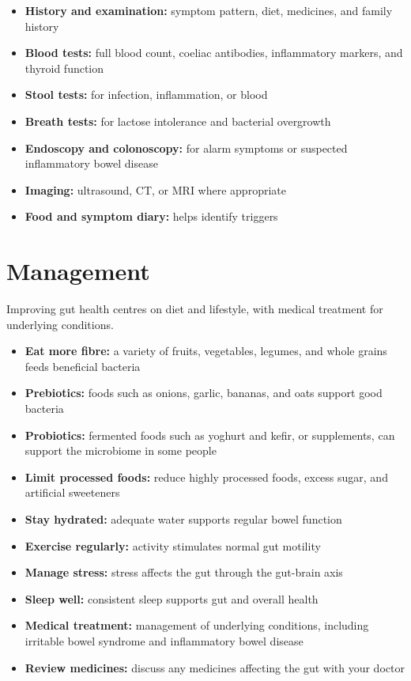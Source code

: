 \begin{itemize}
    \item \textbf{History and examination:} symptom pattern, diet, medicines, and family history
    \item \textbf{Blood tests:} full blood count, coeliac antibodies, inflammatory markers, and thyroid function
    \item \textbf{Stool tests:} for infection, inflammation, or blood
    \item \textbf{Breath tests:} for lactose intolerance and bacterial overgrowth
    \item \textbf{Endoscopy and colonoscopy:} for alarm symptoms or suspected inflammatory bowel disease
    \item \textbf{Imaging:} ultrasound, CT, or MRI where appropriate
    \item \textbf{Food and symptom diary:} helps identify triggers
\end{itemize}

\section*{Management}
Improving gut health centres on diet and lifestyle, with medical treatment for underlying conditions.

\begin{itemize}
    \item \textbf{Eat more fibre:} a variety of fruits, vegetables, legumes, and whole grains feeds beneficial bacteria
    \item \textbf{Prebiotics:} foods such as onions, garlic, bananas, and oats support good bacteria
    \item \textbf{Probiotics:} fermented foods such as yoghurt and kefir, or supplements, can support the microbiome in some people
    \item \textbf{Limit processed foods:} reduce highly processed foods, excess sugar, and artificial sweeteners
    \item \textbf{Stay hydrated:} adequate water supports regular bowel function
    \item \textbf{Exercise regularly:} activity stimulates normal gut motility
    \item \textbf{Manage stress:} stress affects the gut through the gut-brain axis
    \item \textbf{Sleep well:} consistent sleep supports gut and overall health
    \item \textbf{Medical treatment:} management of underlying conditions, including irritable bowel syndrome and inflammatory bowel disease
    \item \textbf{Review medicines:} discuss any medicines affecting the gut with your doctor
\end{itemize}

